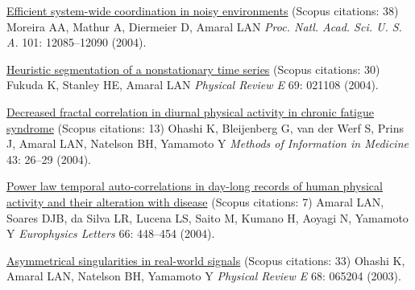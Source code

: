 \NumberedItem{\makebox[0.8cm][r]{[54]}}
\href{/people/amaral/efficient-system-wide-coordination-in-noisy-environments}
{Efficient system-wide coordination in noisy environments}
    (Scopus citations: 38)
\newline
Moreira AA, Mathur A, Diermeier D, Amaral LAN
\newline
\textit{Proc. Natl. Acad. Sci. U. S. A.}
    101:
12085--12090 (2004).
\newline
\Gap
~
\Gap

\NumberedItem{\makebox[0.8cm][r]{[53]}}
\href{/people/amaral/heuristic-segmentation-of-a-nonstationary-time-series}
{Heuristic segmentation of a nonstationary time series}
    (Scopus citations: 30)
\newline
Fukuda K, Stanley HE, Amaral LAN
\newline
\textit{Physical Review E}
    69:
021108 (2004).
\newline
\Gap
~
\Gap

\NumberedItem{\makebox[0.8cm][r]{[52]}}
\href{/people/amaral/decreased-fractal-correlation-in-diurnal-physical-activity-in-chronic-fatigue-syndrome}
{Decreased fractal correlation in diurnal physical activity in chronic fatigue syndrome}
    (Scopus citations: 13)
\newline
Ohashi K, Bleijenberg G, van der Werf S, Prins J, Amaral LAN, Natelson BH, Yamamoto Y
\newline
\textit{Methods of Information in Medicine }
    43:
26--29 (2004).
\newline
\Gap
~
\Gap

\NumberedItem{\makebox[0.8cm][r]{[51]}}
\href{/people/amaral/power-law-temporal-auto-correlations-in-day-long-records-of-human-physical-activity-and-their-alteration-with-disease}
{Power law temporal auto-correlations in day-long records of human physical activity and their alteration with disease}
    (Scopus citations: 7)
\newline
Amaral LAN, Soares DJB, da Silva LR, Lucena LS, Saito M, Kumano H, Aoyagi N, Yamamoto Y
\newline
\textit{Europhysics Letters}
    66:
448--454 (2004).
\newline
\Gap
~
\Gap

\NumberedItem{\makebox[0.8cm][r]{[50]}}
\href{/people/amaral/asymmetrical-singularities-in-real-world-signals}
{Asymmetrical singularities in real-world signals}
    (Scopus citations: 33)
\newline
Ohashi K, Amaral LAN, Natelson BH, Yamamoto Y
\newline
\textit{Physical Review E}
    68:
065204 (2003).
\newline
\Gap
~
\Gap

